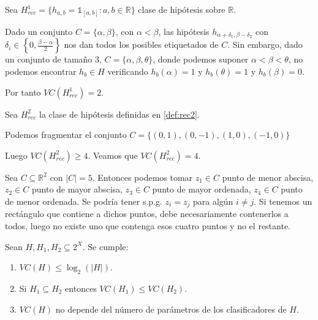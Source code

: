 \begin{example}
Sea $H^1_{rec} = \{h_{a,b} = \mathds{1}_{[a,b]}: a,b\in \mathbb{R}\}$ clase de hipótesis sobre $\mathbb{R}$. 

Dado un conjunto $C=\{\alpha, \beta\}$, con $\alpha < \beta$, las hipótesis $h_{\alpha+\delta_1, \beta - \delta_2}$ con 
$\delta_i \in \left\{0, \frac{\beta - \alpha}{2} \right\}$ nos dan todos los posibles etiquetados de $C$. Sin embargo, 
dado un conjunto de tamaño 3, $C=\{\alpha, \beta, \theta\}$, donde podemos suponer $\alpha < \beta < \theta$, no
podemos encontrar $h_b \in H$ verificando $h_b(\alpha)=1$ y $h_b(\theta) = 1$ y $h_b(\beta) = 0$.

Por tanto $VC(H^1_{rec}) = 2$.
\end{example}

\begin{example}
Sea $H^2_{rec}$ la clase de hipótesis definidas en \ref{def:rec2}.

Podemos fragmentar el conjunto $C = \{(0,1), (0,-1), (1,0), (-1,0)\}$


Luego $VC(H^2_{rec}) \ge 4$. Veamos que $VC(H^2_{rec}) = 4$.

Sea $C\subseteq \mathbb{R}^2$ con $|C|=5$. Entonces podemos 
tomar $z_1 \in C$ punto de menor abscisa, $z_2 \in C$ punto de mayor abscisa, $z_3 \in C$ punto de mayor 
ordenada, $z_4 \in C$ punto de menor ordenada. Se podría tener s.p.g. $z_i = z_j$ para algún $i\neq j$. Si tenemos 
un rectángulo que contiene a dichos puntos, debe necesariamente contenerlos a todos, luego no existe uno que contenga esos
cuatro puntos y no el restante.
\end{example}


\begin{fact}
Sean $H,H_1, H_2 \subseteq 2^X$. Se cumple:
\begin{enumerate}[i]
 \item $VC(H) \le \log_2(|H|)$.
 \item Si $H_1 \subseteq H_2$ entonces $VC(H_1) \le VC(H_2)$.
 \item $VC(H)$ no depende del número de parámetros de los clasificadores de $H$.
\end{enumerate}

\label{fact:props-vc}
\end{fact}

